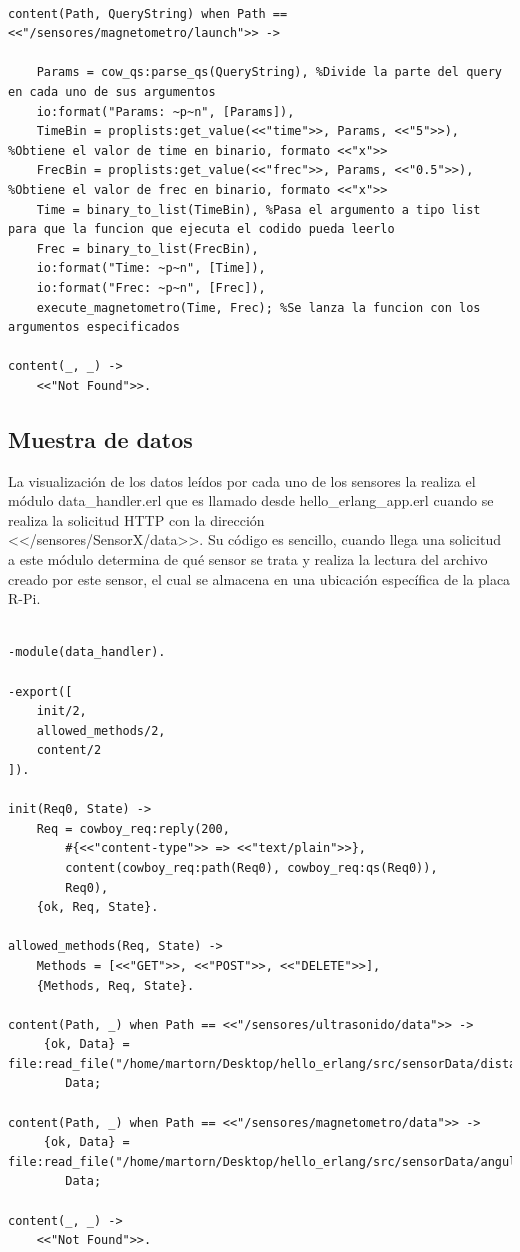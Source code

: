 \begin{lstlisting}[frame=single, caption=launch\_handler.erl]
	
content(Path, QueryString) when Path == <<"/sensores/magnetometro/launch">> ->
	
	Params = cow_qs:parse_qs(QueryString), %Divide la parte del query en cada uno de sus argumentos
	io:format("Params: ~p~n", [Params]),
	TimeBin = proplists:get_value(<<"time">>, Params, <<"5">>), %Obtiene el valor de time en binario, formato <<"x">>
	FrecBin = proplists:get_value(<<"frec">>, Params, <<"0.5">>), %Obtiene el valor de frec en binario, formato <<"x">>
	Time = binary_to_list(TimeBin), %Pasa el argumento a tipo list para que la funcion que ejecuta el codido pueda leerlo
	Frec = binary_to_list(FrecBin),
	io:format("Time: ~p~n", [Time]),
	io:format("Frec: ~p~n", [Frec]),
    execute_magnetometro(Time, Frec); %Se lanza la funcion con los argumentos especificados
  
content(_, _) ->
    <<"Not Found">>.
\end{lstlisting}

\subsection{Muestra de datos}

La visualización de los datos leídos por cada uno de los sensores la realiza el módulo data\_handler.erl que es llamado desde hello\_erlang\_app.erl cuando se realiza la solicitud HTTP con la dirección\\ <</sensores/SensorX/data>>. Su código es sencillo, cuando llega una solicitud a este módulo determina de qué sensor se trata y realiza la lectura del archivo creado por este sensor, el cual se almacena en una ubicación específica de la placa R-Pi. \\

\lstset{language=Erlang, breaklines=true, basicstyle=\sffamily\footnotesize}
\begin{lstlisting}[frame=single, caption=data\_handler.erl]

-module(data_handler).

-export([
    init/2,
    allowed_methods/2,
    content/2
]).

init(Req0, State) ->
    Req = cowboy_req:reply(200,
        #{<<"content-type">> => <<"text/plain">>},
        content(cowboy_req:path(Req0), cowboy_req:qs(Req0)),
        Req0),
    {ok, Req, State}.

allowed_methods(Req, State) ->
    Methods = [<<"GET">>, <<"POST">>, <<"DELETE">>],
    {Methods, Req, State}.
    
content(Path, _) when Path == <<"/sensores/ultrasonido/data">> -> 
     {ok, Data} = file:read_file("/home/martorn/Desktop/hello_erlang/src/sensorData/distancias.txt"),
        Data;
        
content(Path, _) when Path == <<"/sensores/magnetometro/data">> ->
     {ok, Data} = file:read_file("/home/martorn/Desktop/hello_erlang/src/sensorData/angulosCabeceo.txt"),
        Data;

content(_, _) ->
    <<"Not Found">>.
\end{lstlisting}
